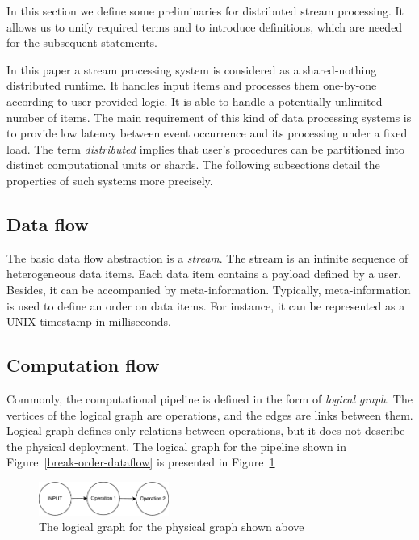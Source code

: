 

\label {fs-stream}

In this section we define some preliminaries for distributed stream processing. It allows us to unify required terms and to introduce definitions, which are needed for the subsequent statements.

In this paper a stream processing system is considered as a shared-nothing distributed runtime. It handles input items and processes them one-by-one according to user-provided logic. It is able to handle a potentially unlimited number of items. The main requirement of this kind of data processing systems is to provide low latency between event occurrence and its processing under a fixed load. The term {\em distributed} implies that user's procedures can be partitioned into distinct computational units or shards. The following subsections detail the properties of such systems more precisely.  

\subsection{Data flow}
The basic data flow abstraction is a {\it stream}. The stream is an infinite sequence of heterogeneous data items. Each data item contains a payload defined by a user. Besides, it can be accompanied by meta-information. Typically, meta-information is used to define an order on data items. For instance, it can be represented as a UNIX timestamp in milliseconds.

\subsection{Computation flow}
Commonly, the computational pipeline is defined in the form of {\it logical graph}. The vertices of the logical graph are operations, and the edges are links between them. Logical graph defines only relations between operations, but it does not describe the physical deployment. The logical graph for the pipeline shown in Figure~\ref{break-order-dataflow} is presented in Figure~\ref{break-order-dataflow-logical}

\begin{figure}[htbp]
  \centering
  \includegraphics[width=0.38\textwidth]{pics/break_order_pipeline_logical}
  \caption{The logical graph for the physical graph shown above} 
  \label {break-order-dataflow-logical}
\end{figure}

